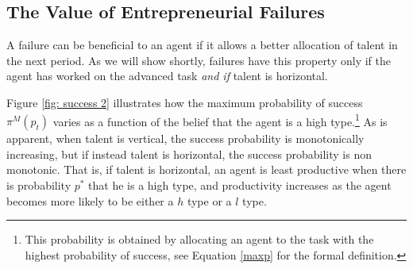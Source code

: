 \documentclass[12pt,american]{paper}
\theoremstyle{remark}
\begin{document}

\subsection{The Value of Entrepreneurial Failures}
A failure can be beneficial to an agent if it allows a better allocation of talent in the next period. As we will show shortly, failures have this property only if the agent has worked on the advanced task  \textit{and if} talent is horizontal. 

 Figure \ref{fig: success 2} illustrates how the maximum probability of success $\pi^M(p_t)$  varies as a function of the belief that the agent is a high type.\footnote{This probability is obtained by allocating an agent to the task with the highest probability of success, see Equation \ref{maxp} for the formal definition.} As is apparent,  when talent is vertical, the success probability is monotonically increasing, but if instead talent is horizontal, the success probability is non monotonic. That is, if talent is horizontal, an agent is least productive when there is probability $p^*$ that he is a high type, and productivity increases as the agent becomes more likely to be either a $h$ type or a $l$ type. 
\end{document}
